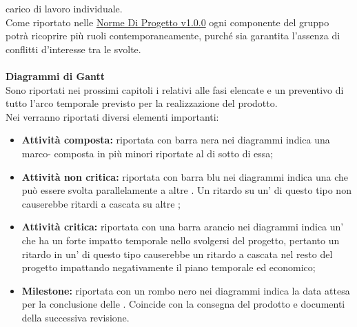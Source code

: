 \documentclass{scalatekids-article}
\begin{document}
carico di lavoro individuale.\\
Come riportato nelle \href{run:../Interni/NormeDiProgetto\_v1.0.0.pdf}{Norme Di Progetto v1.0.0} ogni componente del gruppo potrà ricoprire più ruoli contemporaneamente, purché sia garantita l'assenza di conflitti d'interesse tra le  svolte.\\ \\
\textbf{Diagrammi di Gantt}\\
Sono riportati nei prossimi capitoli i  relativi alle fasi elencate e un  preventivo di tutto l'arco temporale previsto per la realizzazione del prodotto.\\
Nei  verranno riportati diversi elementi importanti:
\begin{itemize}
\item \textbf{Attività composta:} riportata con barra nera nei diagrammi indica una marco- composta in più  minori riportate al di sotto di essa;
\item \textbf{Attività non critica:} riportata con barra blu nei diagrammi indica una  che può essere svolta parallelamente a altre . Un ritardo su un' di questo tipo non causerebbe ritardi a cascata su altre ;
\item \textbf{Attività critica:} riportata con una barra arancio nei diagrammi indica un' che ha un forte impatto temporale nello svolgersi del progetto, pertanto un ritardo in un' di questo tipo causerebbe un ritardo a cascata nel resto del progetto impattando negativamente il piano temporale ed economico;
\item \textbf{Milestone:} riportata con un rombo nero nei diagrammi indica la data attesa per la conclusione delle . Coincide con la consegna del prodotto e documenti della successiva revisione.
\end{itemize}
\end{document}
